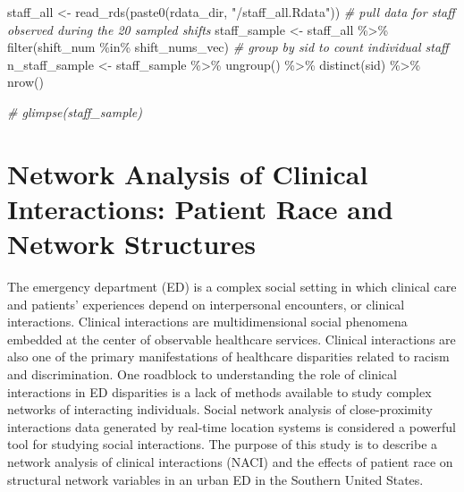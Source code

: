 \documentclass[
]{article}
\newenvironment{Shaded}{\begin{snugshade}}{\end{snugshade}}
\newcommand{\CommentTok}[1]{\textcolor[rgb]{0.56,0.35,0.01}{\textit{#1}}}
\newcommand{\FunctionTok}[1]{\textcolor[rgb]{0.00,0.00,0.00}{#1}}
\newcommand{\NormalTok}[1]{#1}
\newcommand{\OtherTok}[1]{\textcolor[rgb]{0.56,0.35,0.01}{#1}}
\newcommand{\SpecialCharTok}[1]{\textcolor[rgb]{0.00,0.00,0.00}{#1}}
\newcommand{\StringTok}[1]{\textcolor[rgb]{0.31,0.60,0.02}{#1}}
\begin{document}
\begin{Shaded}
\begin{Highlighting}[]
\NormalTok{staff\_all }\OtherTok{\textless{}{-}} \FunctionTok{read\_rds}\NormalTok{(}\FunctionTok{paste0}\NormalTok{(rdata\_dir, }\StringTok{"/staff\_all.Rdata"}\NormalTok{))}
\CommentTok{\# pull data for staff observed during the 20 sampled shifts}
\NormalTok{staff\_sample }\OtherTok{\textless{}{-}}\NormalTok{ staff\_all }\SpecialCharTok{\%\textgreater{}\%} 
  \FunctionTok{filter}\NormalTok{(shift\_num }\SpecialCharTok{\%in\%}\NormalTok{ shift\_nums\_vec)}
\CommentTok{\# group by sid to count individual staff}
\NormalTok{n\_staff\_sample }\OtherTok{\textless{}{-}}\NormalTok{ staff\_sample }\SpecialCharTok{\%\textgreater{}\%} 
  \FunctionTok{ungroup}\NormalTok{() }\SpecialCharTok{\%\textgreater{}\%} 
  \FunctionTok{distinct}\NormalTok{(sid) }\SpecialCharTok{\%\textgreater{}\%} 
  \FunctionTok{nrow}\NormalTok{()}

\CommentTok{\# glimpse(staff\_sample)}
\end{Highlighting}
\end{Shaded}

\hypertarget{network-analysis-of-clinical-interactions-patient-race-and-network-structures}{%
\section{Network Analysis of Clinical Interactions: Patient Race and
Network
Structures}\label{network-analysis-of-clinical-interactions-patient-race-and-network-structures}}

The emergency department (ED) is a complex social setting in which
clinical care and patients' experiences depend on interpersonal
encounters, or clinical interactions. Clinical interactions are
multidimensional social phenomena embedded at the center of observable
healthcare services. Clinical interactions are also one of the primary
manifestations of healthcare disparities related to racism and
discrimination. One roadblock to understanding the role of clinical
interactions in ED disparities is a lack of methods available to study
complex networks of interacting individuals. Social network analysis of
close-proximity interactions data generated by real-time location
systems is considered a powerful tool for studying social interactions.
The purpose of this study is to describe a network analysis of clinical
interactions (NACI) and the effects of patient race on structural
network variables in an urban ED in the Southern United States.
\end{document}
